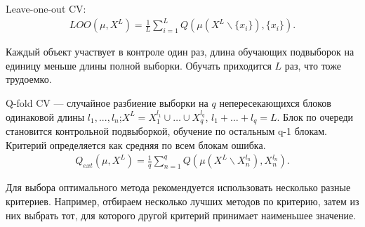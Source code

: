 \documentclass[12pt]{article}
\begin{document}
	Leave-one-out CV:
	\begin{eqnarray}\label{LOO}  
		LOO(\mu, X^L) =\frac{1}{L} \sum_{i = 1}^{L} Q (\mu(X^L \backslash \{x_i\}), \{x_i\}). 
	\end{eqnarray}
	
	Каждый объект участвует в контроле один раз, длина обучающих подвыборок на единицу меньше длины полной выборки. Обучать приходится $L$ раз, что тоже трудоемко.
	
	Q-fold CV --- случайное разбиение выборки на $q$ непересекающихся блоков одинаковой длины $l_1, ..., l_n$;$ X^L = X_{1}^{l_1} \cup \dots \cup  X_{q}^{l_q}$, $l_1 + \dots + l_q = L$. Блок по очереди становится контрольной подвыборкой, обучение по остальным q-1 блокам. Критерий определяется как средняя по всем блокам ошибка. 
	\begin{eqnarray}\label{Q-fold}  
		Q_{ext}(\mu, X^L) =\frac{1}{q} \sum_{n = 1}^{q} Q (\mu(X^L \backslash X_{n}^{l_n}), X_{n}^{l_n}). 
	\end{eqnarray}
	
	Для выбора оптимального метода рекомендуется использовать несколько разные критериев. Например, отбираем  несколько лучших методов по критерию, затем из них выбрать тот, для которого другой критерий принимает наименьшее значение.
	
		
\end{document}
